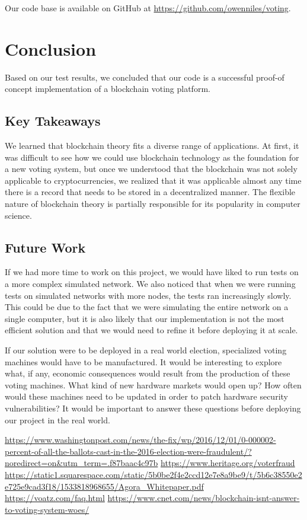 \documentclass[conference]{IEEEtran}
\begin{document}
Our code base is available on GitHub at \url{https://github.com/owenniles/voting}.

\section{Conclusion}
Based on our test results, we concluded that our code is a successful proof-of concept implementation of a blockchain voting platform.

\subsection{Key Takeaways}

We learned that blockchain theory fits a diverse range of applications. At
first, it was difficult to see how we could use blockchain
technology as the foundation for a new voting system, but once we
understood that the blockchain was not solely applicable to
cryptocurrencies, we realized that it was applicable almost any
time there is a record that needs to be stored in a decentralized
manner. The flexible nature of blockchain
theory is partially responsible for its popularity in computer science.

\subsection{Future Work}

If we had more time to work on this project, we would have liked
to run tests on a more complex simulated network. We also noticed
that when we were running tests on simulated networks with more
nodes, the tests ran increasingly slowly. This could be due to the
fact that we were simulating the entire network on a single
computer, but it is also likely that our implementation is not the
most efficient solution and that we would need to refine it before
deploying it at scale.

If our solution were to be deployed in a real world election,
specialized voting machines would have to be manufactured. It
would be interesting to explore what, if any, economic
consequences would result from the production of these voting
machines. What kind of new hardware markets would open up? How
often would these machines need to be updated in order to patch
hardware security vulnerabilities? It would be important to answer
these questions before deploying our project in the real world.

\begin{thebibliography}{00}
 \url{https://www.washingtonpost.com/news/the-fix/wp/2016/12/01/0-000002-percent-of-all-the-ballots-cast-in-the-2016-election-were-fraudulent/?noredirect=on\&utm\_term=.f87baac4c97b}
 \url{https://www.heritage.org/voterfraud}
 \url{https://static1.squarespace.com/static/5b0be2f4e2ccd12e7e8a9be9/t/5b6c38550e2e725e9cad3f18/1533818968655/Agora\_Whitepaper.pdf}
 \url{https://voatz.com/faq.html}
 \url{https://www.cnet.com/news/blockchain-isnt-answer-to-voting-system-woes/}
\end{thebibliography}
\end{document}
